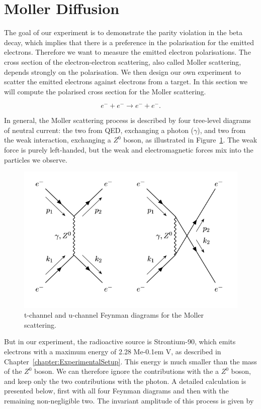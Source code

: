 \documentclass[10pt,swedish, openany]{book}
\def\MeV{\ifmmode {\mathrm{\ Me\kern -0.1em V}}\else
                   \textrm{Me\kern -0.1em V}\fi}%
\begin{document}
\section{Moller Diffusion}

The goal of our experiment is to demonstrate the parity violation in the beta decay, which implies that there is a preference in the polarisation for the emitted electrons. Therefore we want to measure the emitted electron polarisations. The cross section of the electron-electron scattering, also called Moller scattering,  depends strongly on the polarisation. We then design our own experiment to scatter the emitted electrons against electrons from a target. In this section we will compute the polarised cross section for the Moller scattering.

\begin{equation}
    e^- + e^- \rightarrow e^- + e^-.
\end{equation}

In general, the Moller scattering process is described by four tree-level diagrams of neutral current: the two from QED, exchanging a photon ($\gamma$), and two from the weak interaction, exchanging a $Z^0$ boson, as illustrated in Figure~\ref{fig:MollerScattering}. The weak force is purely left-handed, but the weak and electromagnetic forces mix into the particles we observe. \\

\begin{figure}[h]
\includegraphics[scale=0.5]{moller.png}
\centering
\caption{t-channel and u-channel Feynman diagrams for the Moller scattering.}
\label{fig:MollerScattering}
\end{figure}

But in our experiment, the radioactive source is Strontium-90, which emits electrons with a maximum energy of 2.28 \MeV, as described in Chapter~\ref{chapter:ExperimentalSetup}. This energy is much smaller than the mass of the $Z^0$ boson. We can therefore ignore the contributions with the a $Z^0$ boson, and keep only the two contributions with the photon. A detailed calculation is presented below, first with all four Feynman diagrams and then with the remaining non-negligible two. The invariant amplitude of this process is given by
\end{document}
